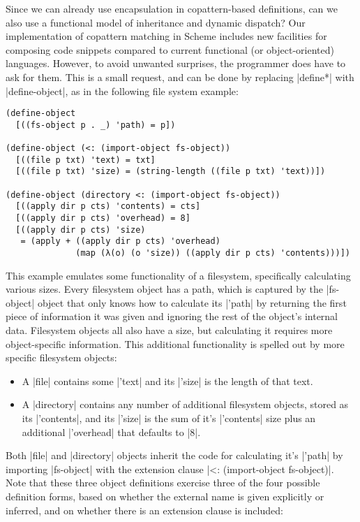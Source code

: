 Since we can already use encapsulation in copattern-based definitions, can we also use a functional model \cite{abadi96} of inheritance and dynamic dispatch?
Our implementation of copattern matching in Scheme includes new facilities for composing code snippets compared to current functional (or object-oriented) languages.
However, to avoid unwanted surprises, the programmer does have to ask for them.
This is a small request, and can be done by replacing \scm|define*| with \scm|define-object|, as in the following file system example:
\begin{verbatim}
(define-object
  [((fs-object p . _) 'path) = p])

(define-object (<: (import-object fs-object))
  [((file p txt) 'text) = txt]
  [((file p txt) 'size) = (string-length ((file p txt) 'text))])

(define-object (directory <: (import-object fs-object))
  [((apply dir p cts) 'contents) = cts]
  [((apply dir p cts) 'overhead) = 8]
  [((apply dir p cts) 'size)
   = (apply + ((apply dir p cts) 'overhead)
              (map (λ(o) (o 'size)) ((apply dir p cts) 'contents)))])
\end{verbatim}
This example emulates some functionality of a filesystem, specifically calculating various sizes.
Every filesystem object has a path, which is captured by the \scm|fs-object| object that only knows how to calculate its \scm|'path| by returning the first piece of information it was given and ignoring the rest of the object's internal data.
Filesystem objects all also have a size, but calculating it requires more object-specific information.
This additional functionality is spelled out by more specific filesystem objects:
\begin{itemize}
\item A \scm|file| contains some \scm|'text| and its \scm|'size| is the length of that text.
\item A \scm|directory| contains any number of additional filesystem objects, stored as its \scm|'contents|, and its \scm|'size| is the sum of it's \scm|'contents| size plus an additional \scm|'overhead| that defaults to \scm|8|.
\end{itemize}
Both \scm|file| and \scm|directory| objects inherit the code for calculating it's \scm|'path| by importing \scm|fs-object| with the extension clause \scm|<: (import-object fs-object)|.
Note that these three object definitions exercise three of the four possible definition forms, based on whether the external name is given explicitly or inferred, and on whether there is an extension clause is included:
